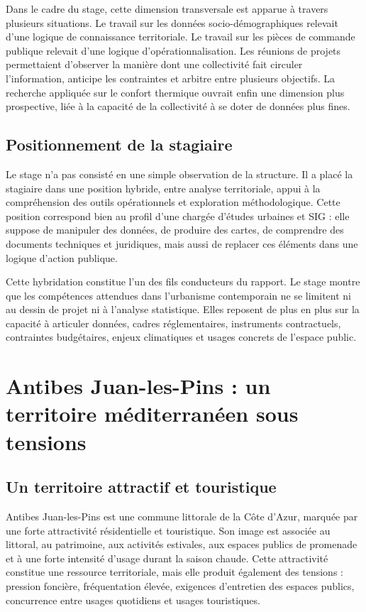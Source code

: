 \documentclass[11pt,a4paper]{report}
\begin{document}
Dans le cadre du stage, cette dimension transversale est apparue à travers plusieurs situations. Le travail sur les données socio-démographiques relevait d'une logique de connaissance territoriale. Le travail sur les pièces de commande publique relevait d'une logique d'opérationnalisation. Les réunions de projets permettaient d'observer la manière dont une collectivité fait circuler l'information, anticipe les contraintes et arbitre entre plusieurs objectifs. La recherche appliquée sur le confort thermique ouvrait enfin une dimension plus prospective, liée à la capacité de la collectivité à se doter de données plus fines.

\subsection{Positionnement de la stagiaire}

Le stage n'a pas consisté en une simple observation de la structure. Il a placé la stagiaire dans une position hybride, entre analyse territoriale, appui à la compréhension des outils opérationnels et exploration méthodologique. Cette position correspond bien au profil d'une chargée d'études urbaines et SIG : elle suppose de manipuler des données, de produire des cartes, de comprendre des documents techniques et juridiques, mais aussi de replacer ces éléments dans une logique d'action publique.

Cette hybridation constitue l'un des fils conducteurs du rapport. Le stage montre que les compétences attendues dans l'urbanisme contemporain ne se limitent ni au dessin de projet ni à l'analyse statistique. Elles reposent de plus en plus sur la capacité à articuler données, cadres réglementaires, instruments contractuels, contraintes budgétaires, enjeux climatiques et usages concrets de l'espace public.

\section{Antibes Juan-les-Pins : un territoire méditerranéen sous tensions}

\subsection{Un territoire attractif et touristique}

Antibes Juan-les-Pins est une commune littorale de la Côte d'Azur, marquée par une forte attractivité résidentielle et touristique. Son image est associée au littoral, au patrimoine, aux activités estivales, aux espaces publics de promenade et à une forte intensité d'usage durant la saison chaude. Cette attractivité constitue une ressource territoriale, mais elle produit également des tensions : pression foncière, fréquentation élevée, exigences d'entretien des espaces publics, concurrence entre usages quotidiens et usages touristiques.
\end{document}
